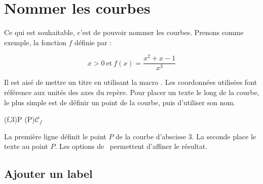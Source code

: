 \section{Nommer les courbes}

Ce qui est souhaitable, c'est de pouvoir nommer les courbes. Prenons comme exemple, la fonction $f$ définie par :

\[
   x>0\ \text{et}\ f(x)=\dfrac{x^2+x-1}{x^3}
\]

Il est aisé de mettre un titre en utilisant la macro . Les coordonnées utilisées font référence aux unités des axes du repère. Pour placer un texte le long de la courbe, le plus simple est de définir un point de la courbe, puis d'utiliser son nom.

\begin{tkzltxexample}[num]
  \tkzFnDefPoint(f,3){P}
  (P){${\mathcal{C}}_f$}
\end{tkzltxexample}

La première ligne définit le point $P$ de la courbe d'abscisse $3$. La seconde place le texte au point $P$. Les options de \TIKZ\ permettent d'affiner le résultat.

\subsection{Ajouter un label}

\begin{center}
\begin{tkzexample}[vbox]
\end{tkzexample}
\end{center}

\endinput

